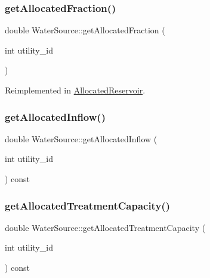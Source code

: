 \subsubsection{\texorpdfstring{get\+Allocated\+Fraction()}{getAllocatedFraction()}}
{\footnotesize\ttfamily double Water\+Source\+::get\+Allocated\+Fraction (\begin{DoxyParamCaption}\item[{int}]{utility\+\_\+id }\end{DoxyParamCaption})\hspace{0.3cm}{\ttfamily [virtual]}}



Reimplemented in \mbox{\hyperlink{classAllocatedReservoir_a731381982c9245b0bf24db4082dc74c1_a731381982c9245b0bf24db4082dc74c1}{Allocated\+Reservoir}}.

\mbox{\label{classWaterSource_a63b1a410b47710db049e2b2e9c3c39a0_a63b1a410b47710db049e2b2e9c3c39a0}} 
\subsubsection{\texorpdfstring{get\+Allocated\+Inflow()}{getAllocatedInflow()}}
{\footnotesize\ttfamily double Water\+Source\+::get\+Allocated\+Inflow (\begin{DoxyParamCaption}\item[{int}]{utility\+\_\+id }\end{DoxyParamCaption}) const}

\mbox{\label{classWaterSource_ab3ba86d2a3e864e435ba2b88cceea555_ab3ba86d2a3e864e435ba2b88cceea555}} 
\subsubsection{\texorpdfstring{get\+Allocated\+Treatment\+Capacity()}{getAllocatedTreatmentCapacity()}}
{\footnotesize\ttfamily double Water\+Source\+::get\+Allocated\+Treatment\+Capacity (\begin{DoxyParamCaption}\item[{int}]{utility\+\_\+id }\end{DoxyParamCaption}) const\hspace{0.3cm}{\ttfamily [virtual]}}



